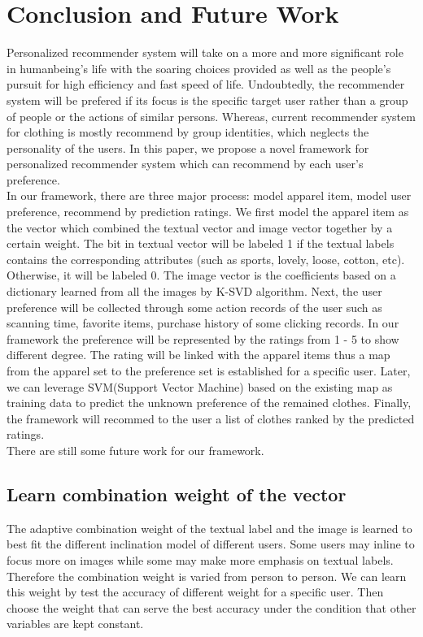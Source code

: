 \section{Conclusion and Future Work}\label{sec:conclusion}

Personalized recommender system will take on a more and more significant role in humanbeing's life with the soaring choices provided as well as the people's pursuit for high efficiency and fast speed of life. Undoubtedly, the recommender system will be prefered if its focus is the specific target user rather than a group of people or the actions of similar persons. Whereas, current recommender system for clothing is mostly recommend by group identities, which neglects the personality of the users. In this paper, we propose a novel framework for personalized recommender system which can recommend by each user's preference.\\

	In our framework, there are three major process: model apparel item, model user preference, recommend by prediction ratings. We first model the apparel item as the vector which combined the textual vector and image vector together by a certain weight. The bit in textual vector will be labeled 1 if the textual labels contains the corresponding attributes (such as sports, lovely, loose, cotton, etc). Otherwise, it will be labeled 0. The image vector is the coefficients based on a dictionary learned from all the images by K-SVD algorithm. Next, the user preference will be collected through some action records of the user such as scanning time, favorite items, purchase history of some clicking records. In our framework the preference will be represented by the ratings from 1 - 5 to show different degree. The rating will be linked with the apparel items thus a map from the apparel set to the preference set is established for a specific user. Later, we can leverage SVM(Support Vector Machine) based on the existing map as training data to predict the unknown preference of the remained clothes. Finally, the framework will recommed to the user a list of clothes ranked by the predicted ratings.\\
	
	There are still some future work for our framework.
\subsection{Learn combination weight of the vector}
The adaptive combination weight of the textual label and the image is learned to best fit the different inclination model of different users. Some users may inline to focus more on images while some may make more emphasis on textual labels. Therefore the combination weight is varied from person to person. We can learn this weight by test the accuracy of different weight for a specific user. Then choose the weight that can serve the best accuracy under the condition that other variables are kept constant.

